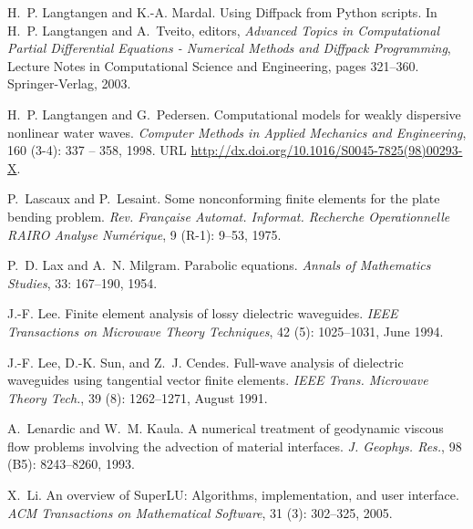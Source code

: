 \begin{thebibliography}{467}
H.~P. Langtangen and K.-A. Mardal.
\newblock Using {D}iffpack from {P}ython scripts.
\newblock In H.~P. Langtangen and A.~Tveito, editors, \emph{Advanced Topics in
  Computational Partial Differential Equations - Numerical Methods and Diffpack
  Programming}, Lecture Notes in Computational Science and Engineering, pages
  321--360. Springer-Verlag, 2003.

H.~P. Langtangen and G.~Pedersen.
\newblock Computational models for weakly dispersive nonlinear water waves.
\newblock \emph{Computer Methods in Applied Mechanics and Engineering},
  160 (3-4): 337 -- 358, 1998.
\newblock URL \url{http://dx.doi.org/10.1016/S0045-7825(98)00293-X}.

P.~Lascaux and P.~Lesaint.
\newblock Some nonconforming finite elements for the plate bending problem.
\newblock \emph{Rev. Fran\c caise Automat. Informat. Recherche Operationnelle
  RAIRO Analyse Num\'erique}, 9 (R-1): 9--53, 1975.

P.~D. Lax and A.~N. Milgram.
\newblock Parabolic equations.
\newblock \emph{Annals of Mathematics Studies}, 33: 167--190, 1954.

J.-F. Lee.
\newblock Finite element analysis of lossy dielectric waveguides.
\newblock \emph{IEEE Transactions on Microwave Theory Techniques}, 42
  (5): 1025--1031, June 1994.

J.-F. Lee, D.-K. Sun, and Z.~J. Cendes.
\newblock Full-wave analysis of dielectric waveguides using tangential vector
  finite elements.
\newblock \emph{IEEE Trans. Microwave Theory Tech.}, 39 (8):
  1262--1271, August 1991.

A.~Lenardic and W.~M. Kaula.
\newblock A numerical treatment of geodynamic viscous flow problems involving
  the advection of material interfaces.
\newblock \emph{J. Geophys. Res.}, 98 (B5): 8243--8260, 1993.

X.~Li.
\newblock An overview of {SuperLU}: {A}lgorithms, implementation, and user
  interface.
\newblock \emph{ACM Transactions on Mathematical Software}, 31
  (3): 302--325, 2005.


\end{thebibliography}

